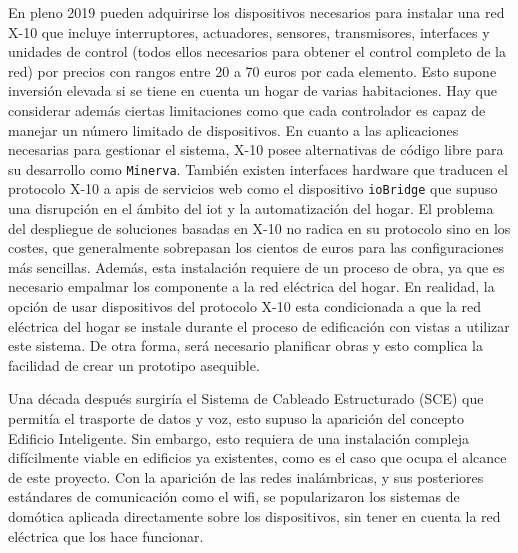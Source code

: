 \vspace{1cm}

En pleno 2019 pueden adquirirse los dispositivos necesarios para instalar una red X-10 que incluye interruptores, actuadores, sensores, transmisores, interfaces y unidades de control (todos ellos necesarios para obtener el control completo de la red) por precios con rangos entre 20 a 70 euros por cada elemento. Esto supone inversión elevada si se tiene en cuenta un hogar de varias habitaciones. Hay que considerar además ciertas limitaciones como que cada controlador es capaz de manejar un número limitado de dispositivos. En cuanto a las aplicaciones necesarias para gestionar el sistema, X-10 posee alternativas de código libre para su desarrollo como \verb|Minerva|. También existen interfaces hardware que traducen el protocolo X-10 a \gls{api}s de servicios web como el dispositivo \verb|ioBridge| que supuso una disrupción en el ámbito del \gls{iot} y la automatización del hogar. El problema del despliegue de soluciones basadas en X-10 no radica en su protocolo sino en los costes, que generalmente sobrepasan los cientos de euros para las configuraciones más sencillas. Además, esta instalación requiere de un proceso de obra, ya que es necesario empalmar los componente a la red eléctrica del hogar. En realidad, la opción de usar dispositivos del protocolo X-10 esta condicionada a que la red eléctrica del hogar se instale durante el proceso de edificación con vistas a utilizar este sistema. De otra forma, será necesario planificar obras y esto complica la facilidad de crear un prototipo asequible.

\vspace{1cm}

Una década después surgiría el Sistema de Cableado Estructurado (SCE) que permitía el trasporte de datos y voz, esto supuso la aparición del concepto Edificio Inteligente. Sin embargo, esto requiera de una instalación compleja difícilmente viable en edificios ya existentes, como es el caso que ocupa el alcance de este proyecto. Con la aparición de las redes inalámbricas, y sus posteriores estándares de comunicación como el \gls{wifi}, se popularizaron los sistemas de domótica aplicada directamente sobre los dispositivos, sin tener en cuenta la red eléctrica que los hace funcionar. 

\vspace{1cm}

